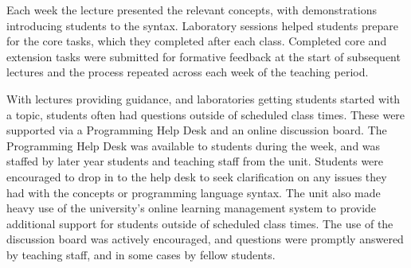 Each week the lecture presented the relevant concepts, with demonstrations introducing students to the syntax. Laboratory sessions helped students prepare for the core tasks, which they completed after each class. Completed core and extension tasks were submitted for formative feedback at the start of subsequent lectures and the process repeated across each week of the teaching period.

With lectures providing guidance, and laboratories getting students started with a topic, students often had questions outside of scheduled class times. These were supported via a Programming Help Desk and an online discussion board. The Programming Help Desk was available to students during the week, and was staffed by later year students and teaching staff from the unit. Students were encouraged to drop in to the help desk to seek clarification on any issues they had with the concepts or programming language syntax. The unit also made heavy use of the university's online learning management system to provide additional support for students outside of scheduled class times. The use of the discussion board was actively encouraged, and questions were promptly answered by teaching staff, and in some cases by fellow students.

